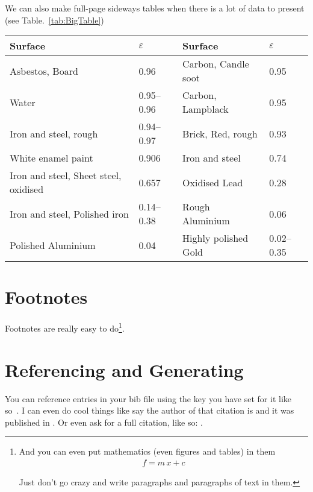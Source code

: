 \documentclass[12pt, BEng]{UoAThesis}
\begin{document}
We can also make full-page sideways tables when there is a lot of data
to present (see Table.~\ref{tab:BigTable})
\begin{sidewaystable}
  \begin{center}
    \begin{tabular}{|p{6.5cm}|p{2.0cm}|||p{4.5cm}|p{2.5cm}|}
      Surface & $\varepsilon$ & Surface & $\varepsilon$ 
      \\\hline\hline%
      Asbestos, Board & 0.96 & Carbon, Candle soot & 0.95 \\
      Water & 0.95--0.96 & Carbon, Lampblack & 0.95\\
      Iron and steel, rough & 0.94--0.97 & Brick, Red, rough & 0.93\\
      White enamel paint & 0.906 & Iron and steel & 0.74\\
      Iron and steel, Sheet steel, oxidised & 0.657 & Oxidised Lead  & 0.28\\
      Iron and steel, Polished iron & 0.14--0.38 & Rough Aluminium & 0.06\\
      Polished Aluminium & 0.04 & Highly polished Gold & 0.02--0.35
    \end{tabular}
  \end{center}
  \caption[Typical values of the emissivity for various materials (sideways)]{
    \label{tab:BigTable}Typical values of the emissivity for various materials, 
    taken from Coulson \& Richardson, Vol.~1, Fig.~9.40.
}
\end{sidewaystable}

\section{Footnotes}
Footnotes are really easy to do\footnote{And you can even put mathematics (even figures and tables) in them 
  \begin{align}
    f=m\,x+c
  \end{align}
  
  Just don't go crazy and write paragraphs and paragraphs of text in
  them. 
}.

\section{Referencing and Generating}
You can reference entries in your bib file using the key you have set
for it like so~\cite{Bannerman_2009}. I can even do cool things like
say the author of that citation is \citeauthor{Bannerman_2009} and it
was published in \citeyear{Bannerman_2009}. Or even ask for a full
citation, like so: .
\end{document}
